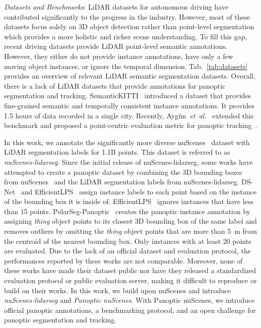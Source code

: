 \documentclass[letterpaper, 10 pt, journal, twoside]{IEEEtran}
\newcommand{\tabref}[1]{Tab.~\ref{#1}}
\begin{document}
\noindent\textit{Datasets and Benchmarks}: LiDAR datasets for autonomous driving have contributed significantly to the progress in the industry. However, most of these datasets focus solely on 3D object detection rather than point-level segmentation which provides a more holistic and richer scene understanding. To fill this gap, recent driving datasets provide LiDAR point-level semantic annotations. However, they either do not provide instance annotations, have only a few moving object instances, or ignore the temporal dimension. \tabref{tab:datasets} provides an overview of relevant LiDAR semantic segmentation datasets. Overall, there is a lack of LiDAR datasets that provide annotations for panoptic segmentation and tracking. SemanticKITTI~\cite{behley2021panoptickitti} introduced a dataset that provides fine-grained semantic and temporally consistent instance annotations. 
It provides 1.5 hours of data recorded in a single city. 
Recently, Aygün~\textit{et~al.}~\cite{aygun20214d} extended this benchmark and proposed a point-centric evaluation metric for panoptic tracking~\cite{hurtado2020mopt}.

In this work, we annotate the significantly more diverse nuScenes~\cite{caesar2020nuscenes} dataset with LiDAR segmentation labels for 1.1B points. This dataset is referred to as \emph{nuScenes-lidarseg}.
Since the initial release of nuScenes-lidarseg, some works have attempted to create a panoptic dataset by combining the 3D bounding boxes from nuScenes~\cite{caesar2020nuscenes} and the LiDAR segmentation labels from nuScenes-lidarseg. 
DS-Net~\cite{hong2021dynamic} and EfficientLPS~\cite{sirohi2021efficientlps} assign instance labels to each point based on the instance of the bounding box it is inside of. 
EfficientLPS~\cite{sirohi2021efficientlps} ignores instances that have less than 15 points. PolarSeg-Panoptic~\cite{zhou2021panoptic} creates the panoptic instance annotation by assigning \emph{thing} object points to its closest 3D bounding box of the same label and removes outliers by omitting the \emph{thing} object points that are more than \SI{5}{\meter} from the centroid of the nearest bounding box.
Only instances with at least 20 points are evaluated.
Due to the lack of an official dataset and evaluation protocol, the performances reported by these works are not comparable. Moreover, none of these works have made their dataset public nor have they released a standardized evaluation protocol or public evaluation server, making it difficult to reproduce or build on their works. In this work, we build upon nuScenes and introduce \emph{nuScenes-lidarseg} and \emph{Panoptic nuScenes}. With Panoptic nuScenes, we introduce official panoptic annotations, a benchmarking protocol, and an open challenge for panoptic segmentation and tracking.
\end{document}
